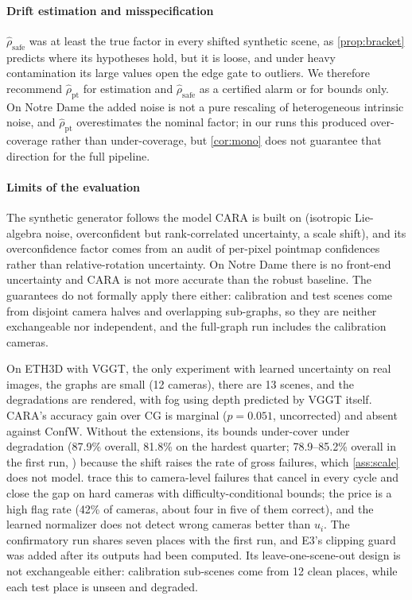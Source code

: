 \paragraph*{Drift estimation and misspecification} $\hat\rho_{\mathrm{safe}}$ was at least the true factor in every shifted synthetic scene, as \cref{prop:bracket} predicts where its hypotheses hold, but it is loose, and under heavy contamination its large values open the edge gate to outliers. We therefore recommend $\hat\rho_{\mathrm{pt}}$ for estimation and $\hat\rho_{\mathrm{safe}}$ as a certified alarm or for bounds only. On Notre Dame the added noise is not a pure rescaling of heterogeneous intrinsic noise, and $\hat\rho_{\mathrm{pt}}$ overestimates the nominal factor; in our runs this produced over-coverage rather than under-coverage, but \cref{cor:mono} does not guarantee that direction for the full pipeline.

\paragraph*{Limits of the evaluation} The synthetic generator follows the model CARA is built on (isotropic Lie-algebra noise, overconfident but rank-correlated uncertainty, a scale shift), and its overconfidence factor comes from an audit of per-pixel pointmap confidences rather than relative-rotation uncertainty. On Notre Dame there is no front-end uncertainty and CARA is not more accurate than the robust baseline. The guarantees do not formally apply there either: calibration and test scenes come from disjoint camera halves and overlapping sub-graphs, so they are neither exchangeable nor independent, and the full-graph run includes the calibration cameras.

On ETH3D with VGGT, the only experiment with learned uncertainty on real images, the graphs are small (12 cameras), there are 13 scenes, and the degradations are rendered, with fog using depth predicted by VGGT itself. CARA's accuracy gain over CG is marginal ($p=0.051$, uncorrected) and absent against ConfW. Without the extensions, its bounds under-cover under degradation (87.9\% overall, 81.8\% on the hardest quarter; 78.9--85.2\% overall in the first run, ) because the shift raises the rate of gross failures, which \cref{ass:scale} does not model.  trace this to camera-level failures that cancel in every cycle and close the gap on hard cameras with difficulty-conditional bounds; the price is a high flag rate (42\% of cameras, about four in five of them correct), and the learned normalizer does not detect wrong cameras better than $u_i$. The confirmatory run shares seven places with the first run, and E3's clipping guard was added after its outputs had been computed. Its leave-one-scene-out design is not exchangeable either: calibration sub-scenes come from 12 clean places, while each test place is unseen and degraded.

